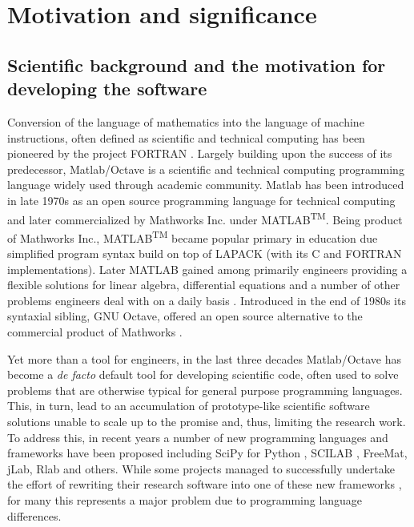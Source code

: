 \section{Motivation and significance}
\subsection{Scientific background and the motivation for developing the software}

Conversion of the language of mathematics into the language of machine instructions, often defined as scientific and technical computing has been pioneered by the project FORTRAN \cite{Backus:1957:FAC}. Largely building upon the success of its predecessor, Matlab/Octave is a scientific and technical computing programming language widely used through academic community. Matlab has been introduced in late 1970s as an open source programming language for technical computing and later commercialized by Mathworks Inc. under MATLAB\textsuperscript{TM}. Being product of Mathworks Inc., MATLAB\textsuperscript{TM} became popular primary in education due simplified program syntax build on top of LAPACK (with its C and FORTRAN implementations). Later MATLAB gained among primarily engineers providing a flexible solutions for linear algebra, differential equations and a number of other problems engineers deal with on a daily basis \cite{moore2014matlab}. Introduced in the end of 1980s its syntaxial sibling, GNU Octave, offered an open source alternative to the commercial product of Mathworks \cite{eaton1997gnu}.

Yet more than a tool for engineers, in the last three decades Matlab/Octave has become a \textit{de facto} default tool for developing scientific code, often used to solve problems that are otherwise typical for general purpose programming languages. This, in turn, lead to an accumulation of prototype-like scientific software solutions unable to scale up to the promise and, thus, limiting the research work. To address this, in recent years a number of new programming languages and frameworks have been proposed including SciPy for Python \cite{jones2001open, Olivier_2002}, SCILAB \cite{Campbell_2009}, FreeMat, jLab, Rlab and others. While some projects managed to successfully undertake the effort of rewriting their research software into one of these new frameworks \cite{17076895, 21349861}, for many this represents a major problem due to programming language differences.


